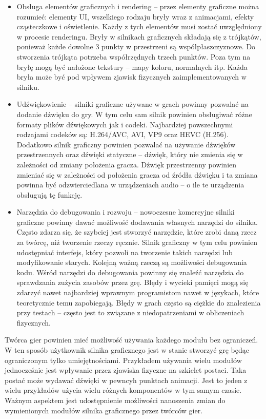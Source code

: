 \documentclass[12pt,twoside]{article}
\begin{document}
\begin{itemize}
\item Obsługa elementów graficznych i rendering -- przez elementy graficzne
można rozumieć: elementy UI, wszelkiego rodzaju bryły wraz z animacjami, efekty
cząsteczkowe i oświetlenie. Każdy z tych elementów musi zostać uwzględniony w
procesie renderingu. Bryły w silnikach graficznych składają się z trójkątów,
ponieważ każde dowolne 3 punkty w przestrzeni są współpłaszczyznowe.  Do
stworzenia trójkąta potrzeba współrzędnych trzech punktów. Poza tym na bryłę
mogą być nałożone tekstury – mapy koloru, normalnych itp. Każda bryła może być
pod wpływem zjawisk fizycznych zaimplementowanych w silniku. 

\item Udźwiękowienie -- silniki graficzne używane w grach powinny pozwalać na
dodanie dźwięku do gry. W tym celu sam silnik powinien obsługiwać różne formaty
plików dźwiękowych jak i codeki. Najbardziej powszechnymi rodzajami codeków są:
H.264/AVC, AVI, VP9 oraz HEVC (H.256). Dodatkowo silnik graficzny powinien
pozwalać na używanie dźwięków przestrzennych oraz dźwięki statyczne -- dźwięk,
który nie zmienia się w zależności od zmiany położenia gracza. Dźwięk
przestrzenny powinien zmieniać się w zależności od położenia gracza od źródła
dźwięku i ta zmiana powinna być odzwierciedlana w urządzeniach audio – o ile te
urządzenia obsługują tę funkcję. 

\item Narzędzia do debugowania i rozwoju -- nowoczesne komercyjne
silniki graficzne powinny dawać możliwość dodawania własnych narzędzi do
silnika. Często zdarza się, że szybciej jest stworzyć narzędzie, które zrobi
daną rzecz za twórcę, niż tworzenie rzeczy ręcznie. Silnik graficzny w tym celu
powinien udostępniać interfejs, który pozwoli na tworzenie takich narzędzi lub
modyfikowanie starych. Kolejną ważną rzeczą są możliwości debugowania kodu.
Wśród narzędzi do debugowania powinny się znaleźć narzędzia do sprawdzania
zużycia zasobów przez grę. Błędy i wycieki pamięci mogą się zdarzyć nawet
najbardziej wprawnym programistom nawet w językach, które teoretycznie temu
zapobiegają. Błędy w grach często są ciężkie do znalezienia przy testach
-- często jest to związane z niedopatrzeniami w obliczeniach
fizycznych. 

\end{itemize}

Twórca gier powinien mieć możliwość używania każdego modułu bez ograniczeń. W
ten sposób użytkownik silnika graficznego jest w stanie stworzyć grę będąc
ograniczonym tylko umiejętnościami. Przykładem używania wielu modułów
jednocześnie jest wpływanie przez zjawiska fizyczne na szkielet postaci. Taka
postać może wydawać dźwięki w pewncyh punktach animacji. Jest to jeden z wielu
przykładów użycia wielu różnych komponentów w tym samym czasie. Ważnym aspektem
jest udostępnienie możliwości nanoszenia zmian do wymienionych modułów silnika
graficznego przez twórców gier. 
\end{document}
